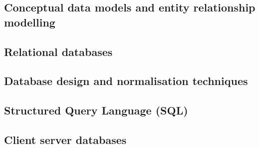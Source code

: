 \subsection{Conceptual data models and entity relationship modelling}

\subsection{Relational databases}

\subsection{Database design and normalisation techniques}

\subsection{Structured Query Language (SQL)}

\subsection{Client server databases}


